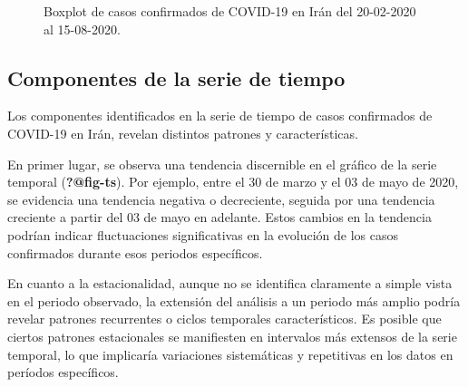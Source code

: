 \documentclass[
  us-letterpaper,
]{scrreprt}
\theoremstyle{plain}
\theoremstyle{definition}
\theoremstyle{definition}
\theoremstyle{plain}
\theoremstyle{remark}
\begin{document}
\begin{figure}


\caption{\label{fig-box}Boxplot de casos confirmados de COVID-19 en Irán
del 20-02-2020 al 15-08-2020.}

\end{figure}%

\subsection{Componentes de la serie de
tiempo}\label{componentes-de-la-serie-de-tiempo}

Los componentes identificados en la serie de tiempo de casos confirmados
de COVID-19 en Irán, revelan distintos patrones y características.

En primer lugar, se observa una tendencia discernible en el gráfico de
la serie temporal (\textbf{?@fig-ts}). Por ejemplo, entre el 30 de marzo
y el 03 de mayo de 2020, se evidencia una tendencia negativa o
decreciente, seguida por una tendencia creciente a partir del 03 de mayo
en adelante. Estos cambios en la tendencia podrían indicar fluctuaciones
significativas en la evolución de los casos confirmados durante esos
periodos específicos.

En cuanto a la estacionalidad, aunque no se identifica claramente a
simple vista en el periodo observado, la extensión del análisis a un
periodo más amplio podría revelar patrones recurrentes o ciclos
temporales característicos. Es posible que ciertos patrones estacionales
se manifiesten en intervalos más extensos de la serie temporal, lo que
implicaría variaciones sistemáticas y repetitivas en los datos en
períodos específicos.
\end{document}

